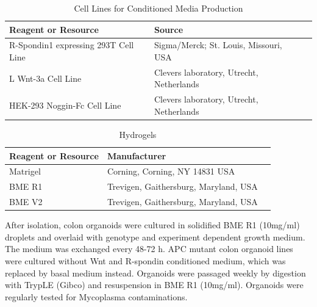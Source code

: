 \begin{flushleft}
\begin{table}[htb]
\caption{Cell Lines for Conditioned Media Production}
\label{tab:recombinant_dna} %
\begin{tabularx}{\textwidth}{Xll}
\toprule
\textbf{Reagent or Resource} & \textbf{Source}\\
\midrule
R-Spondin1 expressing 293T Cell Line & Sigma/Merck; St. Louis, Missouri, USA  \\
L Wnt-3a Cell Line & Clevers laboratory, Utrecht, Netherlands \\
HEK-293 Noggin-Fc Cell Line & Clevers laboratory, Utrecht, Netherlands \\
\bottomrule
\end{tabularx}
\end{table}

\begin{table}[htb]
\caption{Hydrogels}
\label{tab:hydrogels} %
\begin{tabularx}{\textwidth}{XlX}
\toprule
\textbf{Reagent or Resource} & \textbf{Manufacturer} \\
\midrule
Matrigel & Corning, Corning, NY 14831 USA \\
BME R1 & Trevigen, Gaithersburg, Maryland, USA \\
BME V2 & Trevigen, Gaithersburg, Maryland, USA \\
\bottomrule
\end{tabularx}
\end{table}

After isolation, colon organoids were cultured in solidified BME R1 (10mg/ml) droplets and overlaid with genotype and experiment dependent growth medium. The medium was exchanged every 48-72 h. 
APC mutant colon organoid lines were cultured without Wnt and R-spondin conditioned medium, which was replaced by basal medium instead.
Organoids were passaged weekly by digestion with TrypLE (Gibco) and resuspension in BME R1 (10mg/ml). 
Organoids were regularly tested for Mycoplasma contaminations.  


\end{flushleft}
